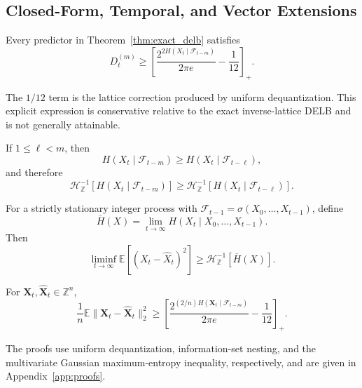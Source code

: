 \subsection{Closed-Form, Temporal, and Vector Extensions}
\label{subsec:closed_form_temporal}

\begin{Corollary}
\label{cor:closed_form_delb}
Every predictor in Theorem~\ref{thm:exact_delb} satisfies
\begin{equation}
D_t^{(m)}
\geq
\left[
\frac{2^{2H(X_t\mid\mathcal F_{t-m})}}{2\pi e}
-\frac1{12}
\right]_+ .
\label{eq:discrete_mse_bound}
\end{equation}
\end{Corollary}

The \(1/12\) term is the lattice correction produced by uniform
dequantization. This explicit expression is conservative relative to the
exact inverse-lattice DELB and is not generally attainable.

\begin{Proposition}
\label{prop:general_horizon_monotonicity}
If \(1\leq\ell<m\), then
\begin{equation}
H(X_t\mid\mathcal F_{t-m})
\geq H(X_t\mid\mathcal F_{t-\ell}),
\label{eq:general_horizon_entropy}
\end{equation}
and therefore
\begin{equation}
\mathcal H_{\mathbb Z}^{-1}[H(X_t\mid\mathcal F_{t-m})]
\geq
\mathcal H_{\mathbb Z}^{-1}[H(X_t\mid\mathcal F_{t-\ell})].
\label{eq:general_horizon_delb}
\end{equation}
\end{Proposition}

\begin{Corollary}
\label{cor:general_stationary_delb}
For a strictly stationary integer process with
\(\mathcal F_{t-1}=\sigma(X_0,\ldots,X_{t-1})\), define
\begin{equation}
\overline H(X)
=\lim_{t\to\infty}H(X_t\mid X_0,\ldots,X_{t-1}).
\label{eq:general_entropy_rate}
\end{equation}
Then
\begin{equation}
\liminf_{t\to\infty}
\mathbb E[(X_t-\widehat X_t)^2]
\geq
\mathcal H_{\mathbb Z}^{-1}[\overline H(X)].
\label{eq:general_stationary_exact_bound}
\end{equation}
\end{Corollary}

\begin{Corollary}
\label{cor:general_vector_delb}
For \(\mathbf X_t,\widehat{\mathbf X}_t\in\mathbb Z^n\),
\begin{equation}
\frac1n\mathbb E\|\mathbf X_t-\widehat{\mathbf X}_t\|_2^2
\geq
\left[
\frac{2^{(2/n)H(\mathbf X_t\mid\mathcal F_{t-m})}}{2\pi e}
-\frac1{12}
\right]_+ .
\label{eq:general_vector_delb}
\end{equation}
\end{Corollary}

The proofs use uniform dequantization, information-set nesting, and the
multivariate Gaussian maximum-entropy inequality, respectively, and are
given in Appendix~\ref{app:proofs}.
